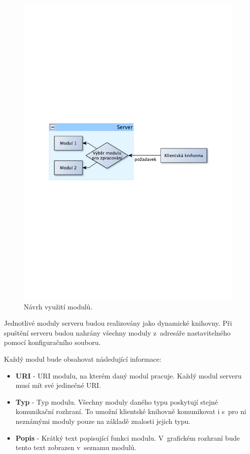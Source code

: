 \begin{figure}[h]
\centering
\includegraphics[trim=11cm 11cm 11cm 11cm, scale=0.7]{fig/navrh_moduly}
\caption{Návrh využití modulů.}
\label{fig:navrh_moduly}
\end{figure}

Jednotlivé moduly serveru budou realizovány jako dynamické knihovny.
Při spuštění serveru budou nahrány všechny moduly z~adresáře nastavitelného pomocí konfiguračního souboru.

Každý modul bude obsahovat následující informace:

\begin{itemize}
\item \textbf{URI} - URI modulu, na kterém daný modul pracuje. Každý modul serveru musí mít své jedinečné URI.
\item \textbf{Typ} - Typ modulu. Všechny moduly daného typu poskytují stejné komunikační rozhraní. To umožní klientské knihovně
komunikovat i s~pro ni neznámými moduly pouze na základě znalosti jejich typu.
\item \textbf{Popis} - Krátký text popisující funkci modulu. V~grafickém rozhraní bude tento text zobrazen v~seznamu modulů.
\end{itemize}

